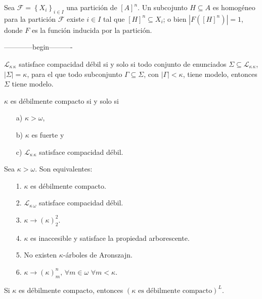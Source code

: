 \begin{definicion}
	Sea $\mathscr{F} = \left\lbrace X_{i}\right\rbrace _{i\in I}$ una partición de $\left[ A\right]^{n}$. Un subcojunto $H \subseteq A$ es homogéneo para la partición $\mathscr{F}$ \sii existe $i\in I$ tal que $\left[  H \right]^{n} \subseteq X_{i}$; o bien \sii $\left|  F\left( \left[  H \right]^{n} \right)  \right| = 1$, donde $F$ es la función inducida por la partición.
\end{definicion}




------------begin----------




\begin{definicion}
$\mathscr{L}_{\kappa \, \kappa}$ satisface compacidad débil si y solo si todo conjunto de enunciados $\Sigma \subseteq \mathscr{L}_{\kappa \, \kappa}$, $|\Sigma| = \kappa$, para el que todo subconjunto $\Gamma \subseteq \Sigma$, con $|\Gamma| < \kappa$, tiene modelo, entonces $\Sigma$ tiene modelo.  
\end{definicion}	 

\begin{definicion}
$\kappa$ es débilmente compacto si y solo si
\begin{itemize}
	\item[a)] $\kappa > \omega$,
	\item[b)] $\kappa$ es fuerte y
	\item[c)] $\mathscr{L}_{\kappa \, \kappa}$ satisface compacidad débil. 
\end{itemize}
\end{definicion}

\begin{teorema}
 Sea $\kappa > \omega$. Son equivalentes:
 \begin{itemize}
 	\item[1.] $\kappa$ es débilmente compacto.
 	\item[2.] $\mathscr{L}_{\kappa \, \omega}$ satisface compacidad débil. 
 	\item[3.] $\kappa \longrightarrow \displaystyle \left(\kappa\right)_{2}^{2}$.
 	\item[4.] $\kappa$ es inaccesible y satisface la propiedad arborescente.
 	\item[5.] No existen $\kappa$-árboles de Aronszajn.
 	\item[6.] $\kappa \longrightarrow \displaystyle \left(\kappa\right)_{m}^{n}, \, \forall m \in \omega \, \, \forall m < \kappa$.	
 \end{itemize}	
\end{teorema}

\begin{teorema}[(Silver)] 
	Si $\kappa$ es débilmente compacto, entonces $(\kappa \mbox{ es débilmente compacto})^L$.
\end{teorema}